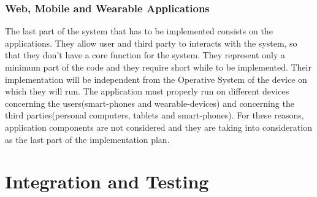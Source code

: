 \subsubsection{Web, Mobile and Wearable Applications}
The last part of the system that has to be implemented consists on the applications. They allow user and third party to interacts with the system, so that they don't have a core function for the system.
They represent only a minimum part of the code and they require short while to be implemented. 
Their implementation will be independent from the Operative System of the device on which they will run.
The application must properly run on different devices concerning the users(smart-phones and wearable-devices) and concerning the third parties(personal computers, tablets and smart-phones). 
For these reasons, application components are not considered  and they are taking into consideration as the last part of the implementation plan.

\clearpage
\section{Integration and Testing}
